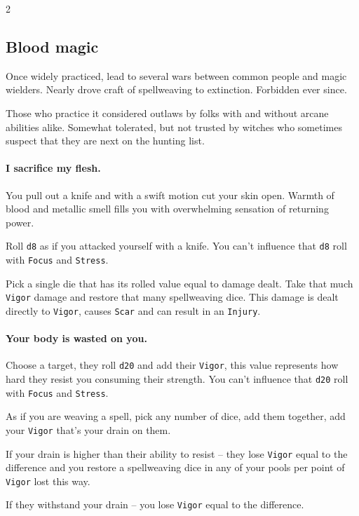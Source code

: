 \begin{multicols*}{2}

\subsection*{Blood magic}

Once widely practiced, lead to several wars between common people and magic wielders. Nearly drove craft of spellweaving to extinction. 
Forbidden ever since. 

Those who practice it considered outlaws by folks with and without arcane abilities alike. 
Somewhat tolerated, but not trusted by witches who sometimes suspect that they are next on the hunting list.

\paragraph{I sacrifice my flesh.} You pull out a knife and with a swift motion cut your skin open. 
Warmth of blood and metallic smell fills you with overwhelming sensation of returning power. 

Roll \texttt{d8} as if you attacked yourself with a knife. You can't influence that \texttt{d8} roll with \texttt{Focus} and \texttt{Stress}.

Pick a single die that has its rolled value equal to damage dealt. Take that much \texttt{Vigor} damage and restore that many spellweaving dice.
This damage is dealt directly to \texttt{Vigor}, causes \texttt{Scar} and can result in an \texttt{Injury}. 



\paragraph{Your body is wasted on you. } Choose a target, they roll \texttt{d20} and add their \texttt{Vigor}, this value represents how hard they resist you consuming their strength. 
You can't influence that \texttt{d20} roll with \texttt{Focus} and \texttt{Stress}.
 
As if you are weaving a spell, pick any number of dice, add them together, add your \texttt{Vigor} that's your drain on them. 
 
If your drain is higher than their ability to resist -- they lose \texttt{Vigor} equal to the difference and you restore a spellweaving dice in any of your pools per point of \texttt{Vigor} lost this way.

If they withstand your drain -- you lose \texttt{Vigor} equal to the difference. 

\end{multicols*}
